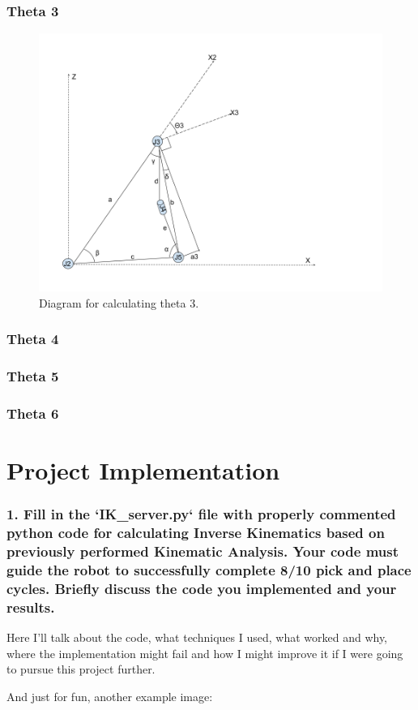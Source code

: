 \documentclass{article}
\begin{document}
\subsubsection{Theta 3}
\begin{figure}[H]
    \includegraphics[width=\linewidth]{theta3.png}
    \caption{Diagram for calculating theta 3.}
    \label{fig:theta3}
\end{figure}

\subsubsection{Theta 4}

\subsubsection{Theta 5}

\subsubsection{Theta 6}

\section{Project Implementation}

\subsubsection{1. Fill in the `IK\_server.py` file with properly commented python code for calculating Inverse Kinematics based on previously performed Kinematic Analysis. Your code must guide the robot to successfully complete 8/10 pick and place cycles. Briefly discuss the code you implemented and your results.}


Here I'll talk about the code, what techniques I used, what worked and why, where the implementation might fail and how I might improve it if I were going to pursue this project further.  


And just for fun, another example image:
\end{document}
